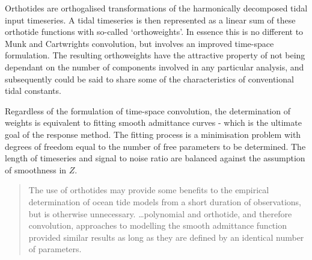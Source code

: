Orthotides are orthogalised transformations of the harmonically decomposed tidal input timeseries.
A tidal timeseries is then represented as a linear sum of these orthotide functions with so-called `orthoweights'. In essence this is no different to Munk and Cartwrights convolution, but involves an improved time-space formulation.  
The resulting orthoweights have the attractive property of not being dependant on the number of components involved in any particular analysis, and subsequently could be said to share some of the characteristics of conventional tidal constants.

Regardless of the formulation of time-space convolution, the determination of weights is equivalent to fitting smooth admittance curves - which is the ultimate goal of the response method.  The fitting process is a minimisation problem with degrees of freedom equal to the number of free parameters to be determined.    The length of timeseries and signal to noise ratio are balanced against the assumption of smoothness in $Z$.
\begin{quotation}   
The use of orthotides may provide some benefits to the empirical determination of ocean tide models from a short duration of observations, but is otherwise unnecessary. \dots  polynomial and orthotide, and therefore convolution, approaches to modelling the smooth admittance function provided similar results as long as they are defined by an identical number of parameters.\citep{Desai:2006wo}
\end{quotation}
